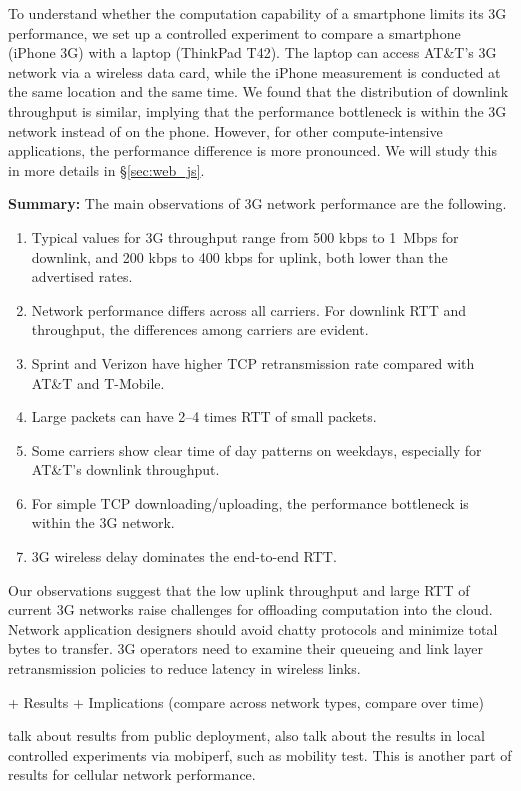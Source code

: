 \label{sec:net_platform}

To understand whether the computation capability of a smartphone
limits its 3G performance, we set up a controlled experiment to
compare a smartphone (iPhone 3G) with a laptop (ThinkPad T42). The 
laptop can access AT\&T's 3G network via a wireless data card, while 
the iPhone measurement is conducted at the same location and the 
same time. We found that the distribution of downlink throughput is 
similar, implying that the performance bottleneck is within the 
3G network instead of on the phone. However, for other 
compute-intensive applications, the performance difference is
more pronounced. We will study this in more details in \S\ref{sec:web_js}.

\noindent\textbf{Summary:} The main observations of 3G network
performance are the following.

\begin{enumerate}
\item Typical values for 3G throughput range from 500 kbps to 1~Mbps
for downlink, and 200 kbps to 400 kbps for uplink, both lower than 
the advertised rates.

\item Network performance differs across all carriers. For downlink 
RTT and throughput, the differences among carriers are evident.

\item Sprint and Verizon have higher TCP retransmission rate 
compared with AT\&T and T-Mobile.

\item Large packets can have 2--4 times RTT of small packets.

\item Some carriers show clear time of day patterns on weekdays, 
especially for AT\&T's downlink throughput.

\item For simple TCP downloading/uploading, the performance 
bottleneck is within the 3G network.

\item 3G wireless delay dominates the end-to-end RTT.
\end{enumerate}

Our observations suggest that the low uplink throughput and large
RTT of current 3G networks raise challenges for offloading computation 
into the cloud. Network application designers should avoid chatty 
protocols and minimize total bytes to transfer. 3G operators need to 
examine their queueing and link layer retransmission policies to 
reduce latency in wireless links. 



+ Results
+ Implications (compare across network types, compare over time)

talk about results from public deployment, also talk about the results in local controlled experiments via mobiperf, such as mobility test. This is another part of results for cellular network performance.
